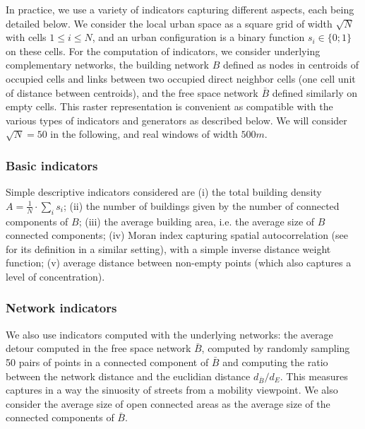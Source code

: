 \documentclass[letterpaper]{article}
\begin{document}
In practice, we use a variety of indicators capturing different aspects, each being detailed below. We consider the local urban space as a square grid of width $\sqrt{N}$ with cells $1 \leq i \leq N$, and an urban configuration is a binary function $s_i \in \{0;1\}$ on these cells. For the computation of indicators, we consider underlying complementary networks, the building network $B$ defined as nodes in centroids of occupied cells and links between two occupied direct neighbor cells (one cell unit of distance between centroids), and the free space network $\bar{B}$ defined similarly on empty cells. This raster representation is convenient as compatible with the various types of indicators and generators as described below. We will consider $\sqrt{N}=50$ in the following, and real windows of width $500m$.

\subsubsection{Basic indicators}
Simple descriptive indicators considered are (i) the total building density $A = \frac{1}{N}\cdot \sum_i s_i$; (ii) the number of buildings given by the number of connected components of $B$; (iii) the average building area, i.e. the average size of $B$ connected components; (iv) Moran index capturing spatial autocorrelation (see \cite{raimbault2018calibration} for its definition in a similar setting), with a simple inverse distance weight function; (v) average distance between non-empty points (which also captures a level of concentration).


\subsubsection{Network indicators}

We also use indicators computed with the underlying networks: the average detour computed in the free space network $\bar{B}$, computed by randomly sampling 50 pairs of points in a connected component of $\bar{B}$ and computing the ratio between the network distance and the euclidian distance $d_{\bar{B}}/d_E$. This measures captures in a way the sinuosity of streets from a mobility viewpoint. We also consider the average size of open connected areas as the average size of the connected components of $\bar{B}$.
\end{document}
